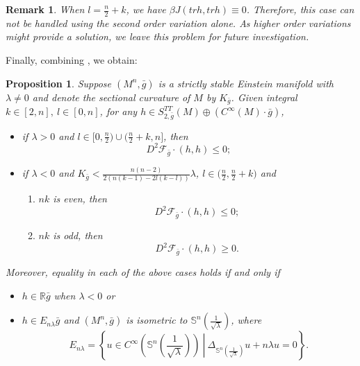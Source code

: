 \documentclass[12pt]{amsart}
\newtheorem{proposition}{Proposition}[section]
\newtheorem{remark}{Remark}[section]
\newcommand{\bg}{\bar{g}}
\numberwithin{equation}{section}
\begin{document}
\begin{remark}
    When $l=\frac{n}{2}+k$, we have $\beta J(trh,trh)\equiv0$. Therefore, this case can not be handled using the second order variation alone. As higher order variations might provide a solution, we leave this problem for future investigation.
\end{remark}

Finally, combining , we obtain:
\begin{proposition}\label{Proposition: Negativity}
Suppose $(M^n,\bg)$ is a strictly stable Einstein manifold with $\lambda \neq 0$ and denote the sectional curvature of $M$ by $K_{\bg}$. Given integral $k\in\left[2,n\right],\ l\in[0,n]$, for any $h\in S_{2,\bg}^{TT} (M)\oplus(C^{\infty}(M) \cdot \bg)$, 
    \begin{itemize}
        \item if $\lambda>0$ and $l\in\big[0,\frac{n}{2}\big)\cup\big(\frac{n}{2}+k,n\big]$, then
    \begin{equation*}
    D^2 \mathcal{F}_{\bg} \cdot (h,h) \leq 0;
    \end{equation*}
    \item if $\lambda<0$ and $K_{\bg} < \frac{n(n-2)}{2\left(n(k-1)-2l(k-l)\right)}\lambda$, $l\in\big(\frac{n}{2},\frac{n}{2}+k\big)$ and
    \begin{enumerate}
        \item $nk$ is even, then
        \begin{equation*}
        D^2\mathcal{F}_{\bg}\cdot(h,h) \leq 0;
        \end{equation*}
    \item $nk$ is odd, then
        \begin{equation*}
            D^2\mathcal{F}_{\bg}\cdot(h,h) \geq 0.
        \end{equation*}
    \end{enumerate}
    \end{itemize}
Moreover, equality in each of the above cases holds if and only if 
\begin{itemize}
    \item $h\in\mathbb{R}\bg$ when $\lambda<0$ or
    \item $h\in E_{n\lambda}\bg$ and $(M^n,\bg)$ is isometric to $\mathbb{S}^n \left( \frac{1}{\sqrt{\lambda}} \right)$, where
    \begin{equation*}
        E_{n\lambda} = \left\{\left.u\in C^{\infty}\left(\mathbb{S}^n\left(\frac{1}{\sqrt{\lambda}}\right)\right)\ \right|\ \Delta_{\mathbb{S}^n\left(\frac{1}{\sqrt{\lambda}}\right)}u +n\lambda u=0\right\}.
    \end{equation*}

\end{itemize} 
\end{proposition}
\end{document}
